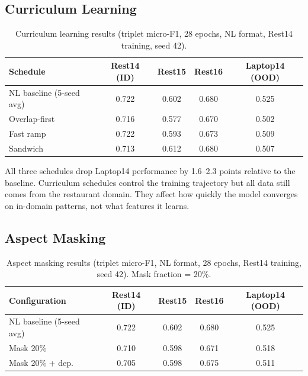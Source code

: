 \documentclass[12pt,a4paper]{report}
\begin{document}
\subsection{Curriculum Learning}\label{sec:curriculum}

\begin{table}[H]
\centering
\caption{Curriculum learning results (triplet micro-F1, 28 epochs, NL format, Rest14 training, seed 42).}
\label{tab:curriculum}
\small
\begin{tabular}{@{}lcccc@{}}
\toprule
\textbf{Schedule} & \textbf{Rest14 (ID)} & \textbf{Rest15} & \textbf{Rest16} & \textbf{Laptop14 (OOD)} \\
\midrule
NL baseline (5-seed avg) & 0.722 & 0.602 & 0.680 & 0.525 \\
\midrule
Overlap-first & 0.716 & 0.577 & 0.670 & 0.502 \\
Fast ramp & 0.722 & 0.593 & 0.673 & 0.509 \\
Sandwich & 0.713 & 0.612 & 0.680 & 0.507 \\
\bottomrule
\end{tabular}
\end{table}

All three schedules drop Laptop14 performance by 1.6--2.3 points relative to the baseline. Curriculum schedules control the training trajectory but all data still comes from the restaurant domain. They affect how quickly the model converges on in-domain patterns, not what features it learns.

\subsection{Aspect Masking}\label{sec:masking}

\begin{table}[H]
\centering
\caption{Aspect masking results (triplet micro-F1, NL format, 28 epochs, Rest14 training, seed 42). Mask fraction = 20\%.}
\label{tab:masking}
\small
\begin{tabular}{@{}lcccc@{}}
\toprule
\textbf{Configuration} & \textbf{Rest14 (ID)} & \textbf{Rest15} & \textbf{Rest16} & \textbf{Laptop14 (OOD)} \\
\midrule
NL baseline (5-seed avg) & 0.722 & 0.602 & 0.680 & 0.525 \\
\midrule
Mask 20\% & 0.710 & 0.598 & 0.671 & 0.518 \\
Mask 20\% + dep. & 0.705 & 0.598 & 0.675 & 0.511 \\
\bottomrule
\end{tabular}
\end{table}
\end{document}
